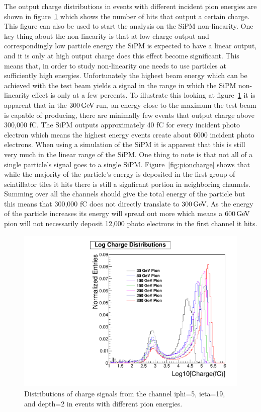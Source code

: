 The output charge distributions in events with different incident pion energies are shown in figure~\ref{fig:Log} which shows the number of hits that output a certain charge. This figure can also be used to start the analysis on the SiPM non-linearity. One key thing about the non-linearity is that at low charge output and correspondingly low particle energy the SiPM is expected to have a linear output, and it is only at high output charge does this effect become significant. This means that, in order to study non-linearity one needs to use particles at sufficiently high energies. Unfortunately the highest beam energy which can be achieved with the test beam yields a signal in the range in which the SiPM non-linearity effect is only at a few percents. To illustrate this looking at figure~\ref{fig:Log} it is apparent that in the $300{\,\text{Ge\hspace{-.08em}V\hspace{-0.16em}}}$ run, an energy close to the maximum the test beam is capable of producing, there are minimally few events that output charge above 300,000 fC. The SiPM outputs approximately 40 fC for every incident photo electron which means the highest energy events create about 6000 incident photo electrons. When using a simulation of the SiPM it is apparent that this is still very much in the linear range of the SiPM. One thing to note is that not all of a single particle's signal goes to a single SiPM. Figure~\ref{fig:pioncharge} shows that while the majority of the particle's energy is deposited in the first group of scintillator tiles it hits there is still a signficant portion in neighboring channels. Summing over all the channels should give the total energy of the particle but this means that 300,000 fC does not directly translate to $300{\,\text{Ge\hspace{-.08em}V\hspace{-0.16em}}}$. As the energy of the particle increases its energy will spread out more which means a $600{\,\text{Ge\hspace{-.08em}V\hspace{-0.16em}}}$ pion will not necessarily deposit 12,000 photo electrons in the first channel it hits.

\begin{figure}
\centering
\includegraphics[width=0.7\linewidth]{Figures/Logplot.pdf}
\caption{Distributions of charge signals from the channel iphi=5, ieta=19, and depth=2 in events with different pion energies.}
\label{fig:Log}
\end{figure}

